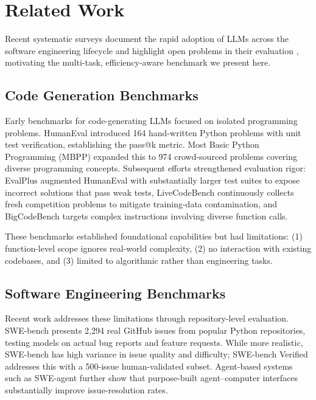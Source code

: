 \section{Related Work}
\label{sec:related}

Recent systematic surveys document the rapid adoption of LLMs across the software engineering lifecycle and highlight open problems in their evaluation \cite{hou2024llm4se, fan2023llm4se}, motivating the multi-task, efficiency-aware benchmark we present here.

\subsection{Code Generation Benchmarks}

Early benchmarks for code-generating LLMs focused on isolated programming problems. HumanEval \cite{chen2021evaluating} introduced 164 hand-written Python problems with unit test verification, establishing the pass@k metric. Most Basic Python Programming (MBPP) \cite{austin2021program} expanded this to 974 crowd-sourced problems covering diverse programming concepts. Subsequent efforts strengthened evaluation rigor: EvalPlus \cite{evalplus} augmented HumanEval with substantially larger test suites to expose incorrect solutions that pass weak tests, LiveCodeBench \cite{livecodebench} continuously collects fresh competition problems to mitigate training-data contamination, and BigCodeBench \cite{bigcodebench} targets complex instructions involving diverse function calls.

These benchmarks established foundational capabilities but had limitations: (1) function-level scope ignores real-world complexity, (2) no interaction with existing codebases, and (3) limited to algorithmic rather than engineering tasks.

\subsection{Software Engineering Benchmarks}

Recent work addresses these limitations through repository-level evaluation. SWE-bench \cite{jimenez2023swe} presents 2,294 real GitHub issues from popular Python repositories, testing models on actual bug reports and feature requests. While more realistic, SWE-bench has high variance in issue quality and difficulty; SWE-bench Verified \cite{swebench_verified} addresses this with a 500-issue human-validated subset. Agent-based systems such as SWE-agent \cite{sweagent} further show that purpose-built agent--computer interfaces substantially improve issue-resolution rates.

